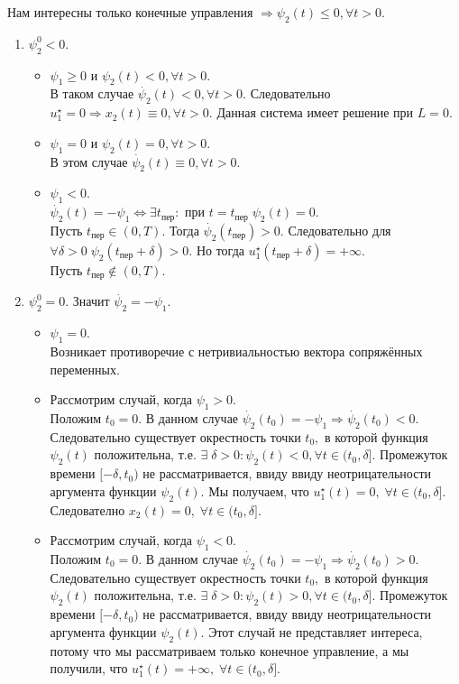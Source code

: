 \documentclass[11pt]{article}
\begin{document}
	Нам интересны только конечные управления $ \Rightarrow \psi_2(t) \leqslant 0, \forall t > 0. $	
	
	\begin{enumerate}
		\item $ \psi_2^0 < 0. $
		\begin{itemize}
			\item $ \psi_1 \geqslant 0 $ и $ \psi_2(t) < 0, \forall t > 0. $ \\
			В таком случае $ \dot{\psi_2}(t) < 0, \forall t > 0. $ Следовательно $ u_1^{\star} = 0 \Rightarrow x_2(t) \equiv 0, \forall t > 0. $ Данная система имеет решение при $ L = 0. $
			\item $ \psi_1 = 0 $ и $ \psi_2(t) = 0, \forall t > 0. $ \\
			В этом случае $ \dot{\psi_2}(t) \equiv 0, \forall t > 0. $
			\item $ \psi_1 < 0. $ \\
			$ \dot{\psi_2}(t) = - \psi_1 \Leftrightarrow \exists t_{\text{пер}}: $ при $ t = t_{\text{пер}}  \; \psi_2(t) = 0. $ \\
			Пусть $ t_{\text{пер}} \in (0, T). $ Тогда   $ \dot{\psi_2}(t_{\text{пер}}) > 0. $ Следовательно для $ \forall \delta > 0 \;  \psi_2(t_{\text{пер}} + \delta) > 0. $ Но тогда $ u_1^{\star}(t_{\text{пер}} + \delta) = +\infty. $ \\
			Пусть $ t_{\text{пер}} \not \in (0, T). $
		\end{itemize}
		\item $ \psi_2^0 = 0. $ Значит $ \dot{\psi_2} = - \psi_1. $
		\begin{itemize}
			\item $ \psi_1 = 0. $ \\
			Возникает противоречие с нетривиальностью вектора сопряжённых переменных.
			\item Рассмотрим случай, когда $ \psi_1 > 0. $ \\ 
			Положим $ t_0 = 0. $ В данном случае $ \dot{\psi_2}(t_0) = -\psi_1 \Rightarrow \dot{\psi_2}(t_0) < 0. $ Следовательно существует окрестность точки $ t_0, $ в которой функция $ \psi_2(t) $ положительна, т.е. $ \exists \; \delta > 0 : \psi_2(t) < 0, \forall t \in (t_0, \delta]. $ Промежуток времени $ [-\delta,  t_0) $ не рассматривается, ввиду ввиду неотрицательности аргумента функции $ \psi_2(t). $ Мы получаем, что $ u_1^{\star}(t) = 0, \;  \forall t \in (t_0, \delta]. $ Следователно $ x_2(t) = 0, \;  \forall t \in (t_0, \delta]. $
			\item Рассмотрим случай, когда $ \psi_1 < 0. $ \\
			Положим $ t_0 = 0. $ В данном случае $ \dot{\psi_2}(t_0) = -\psi_1 \Rightarrow \dot{\psi_2}(t_0) > 0. $ Следовательно существует окрестность точки $ t_0, $ в которой функция $ \psi_2(t) $ положительна, т.е. $ \exists \; \delta > 0 : \psi_2(t) > 0, \forall t \in (t_0, \delta]. $ Промежуток времени $ [-\delta,  t_0) $ не рассматривается, ввиду ввиду неотрицательности аргумента функции $ \psi_2(t). $ Этот случай не представляет интереса, потому что мы рассматриваем только конечное управление, а мы получили, что $ u_1^{\star}(t) = +\infty, \; \forall t \in (t_0, \delta]. $
		\end{itemize}
	\end{enumerate}		
\end{document}
